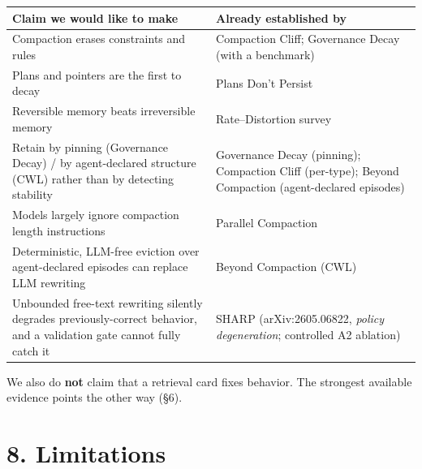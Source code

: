 \documentclass[
]{article}
\newcounter{none} %
\begin{document}
{\def\LTcaptype{none} %
\begin{longtable}[]{@{}
  >{\raggedright\arraybackslash}p{}
  >{\raggedright\arraybackslash}p{}@{}}
\toprule\noalign{}
\begin{minipage}[b]{\linewidth}\raggedright
Claim we would like to make
\end{minipage} & \begin{minipage}[b]{\linewidth}\raggedright
Already established by
\end{minipage} \\
\midrule\noalign{}
\endhead
\bottomrule\noalign{}
\endlastfoot
Compaction erases constraints and rules & Compaction Cliff; Governance
Decay (with a benchmark) \\
Plans and pointers are the first to decay & Plans Don't Persist \\
Reversible memory beats irreversible memory & Rate--Distortion survey \\
Retain by pinning (Governance Decay) / by agent-declared structure (CWL)
rather than by detecting stability & Governance Decay (pinning);
Compaction Cliff (per-type); Beyond Compaction (agent-declared
episodes) \\
Models largely ignore compaction length instructions & Parallel
Compaction \\
Deterministic, LLM-free eviction over agent-declared episodes can
replace LLM rewriting & Beyond Compaction (CWL) \\
Unbounded free-text rewriting silently degrades previously-correct
behavior, and a validation gate cannot fully catch it & SHARP
(arXiv:2605.06822, \emph{policy degeneration}; controlled A2
ablation) \\
\end{longtable}
}

We also do \textbf{not} claim that a retrieval card fixes behavior. The
strongest available evidence points the other way (§6).

\section{8. Limitations}\label{limitations}
\end{document}
